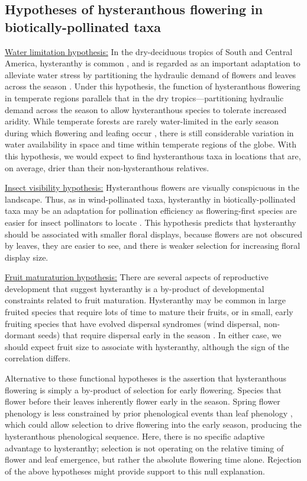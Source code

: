 \documentclass{article}[12pt]
\begin{document}
\subsection*{Hypotheses of hysteranthous flowering in biotically-pollinated taxa}

\underline{Water limitation hypothesis:} In the dry-deciduous tropics of South and Central America, hysteranthy is common \citep{Rathcke_1985,Franklin2016}, and is regarded as an important adaptation to alleviate water stress by partitioning the hydraulic demand of flowers and leaves across the season \citep{Gougherty2018,Franklin2016,Borchert1983,Reich1984}. Under this hypothesis, the function of hysteranthous flowering in temperate regions parallels that in the dry tropics---partitioning hydraulic demand across the season to allow hysteranthous species to tolerate increased aridity. While temperate forests are rarely water-limited in the early season during which flowering and leafing occur \citep{Polgar2011}, there is still considerable variation in water availability in space and time within temperate regions of the globe.  With this hypothesis, we would expect to find hysteranthous taxa in locations that are, on average, drier than their non-hysteranthous relatives.

\underline{Insect visibility hypothesis:} Hysteranthous flowers are visually conspicuous in the landscape. Thus, as in wind-pollinated taxa, hysteranthy in biotically-pollinated taxa may be an adaptation for pollination efficiency as flowering-first species are easier for insect pollinators to locate \citep{Janzen1967}. This hypothesis predicts that hysteranthy should be associated with smaller floral displays, because flowers are not obscured by leaves, they are easier to see, and there is weaker selection for increasing floral display size. 

\underline{Fruit maturaturion hypothesis:} There are several aspects of reproductive development that suggest hysteranthy is a by-product of developmental constraints related to fruit maturation. Hysteranthy may be common in large fruited species that require lots of time to mature their fruits, or in small, early fruiting species that have evolved dispersal syndromes (wind dispersal, non-dormant seeds) that require dispersal early in the season \citep{Primack1987}. In either case, we should expect fruit size to associate with hysteranthy, although the sign of the correlation differs.

Alternative to these functional hypotheses is the assertion that hysteranthous flowering is simply a by-product of selection for early flowering. Species that flower before their leaves inherently flower early in the season. Spring flower phenology is less constrained by prior phenological events than leaf phenology \citep{Savage2019,Ettinger2018}, which could allow selection to drive flowering into the early season, producing the hysteranthous phenological sequence. Here, there is no specific adaptive advantage to hysteranthy;  selection is not operating on the relative timing of flower and leaf emergence, but rather the absolute flowering time alone. Rejection of the above hypotheses might provide support to this null explanation. 
\end{document}
